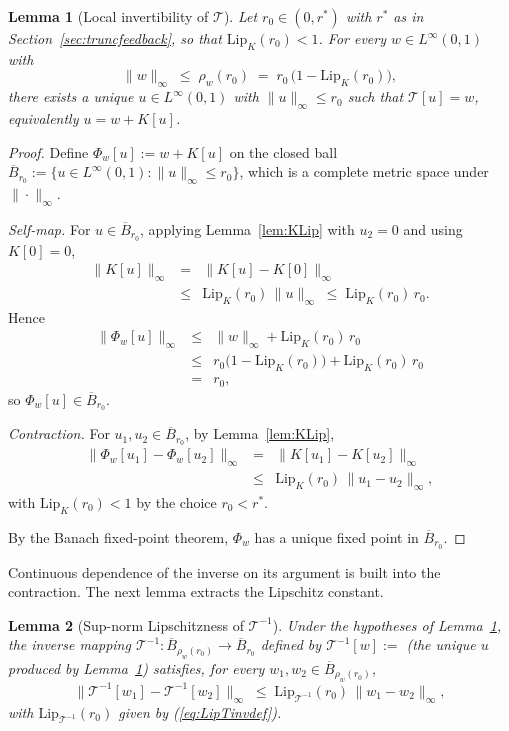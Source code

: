 \documentclass[amsthm]{autart}
\theoremstyle{plain}
\newtheorem{lemma}{Lemma}
\theoremstyle{definition}
\newcommand{\Tcal}{\mathcal{T}}
\newcommand{\Linf}{L^\infty}
\newcommand{\Lipk}{\mathrm{Lip}_K}
\newcommand{\LipT}{\mathrm{Lip}_{\Tcal^{-1}}}
\newcommand{\Bball}{\overline{B}}
\begin{document}
\begin{lemma}[Local invertibility of $\Tcal$]\label{lem:Tinv}
Let $r_0 \in (0, r^*)$ with $r^*$ as in Section~\ref{sec:truncfeedback}, so that $\Lipk(r_0) < 1$. For every $w \in \Linf(0,1)$ with
\begin{equation}
\|w\|_\infty \;\le\; \rho_w(r_0) \;=\; r_0\,\bigl(1 - \Lipk(r_0)\bigr),
\label{eq:winball}
\end{equation}
there exists a unique $u \in \Linf(0,1)$ with $\|u\|_\infty \le r_0$ such that $\Tcal[u] = w$, equivalently $u = w + K[u]$.
\end{lemma}

\begin{proof}
Define $\Phi_w[u] := w + K[u]$ on the closed ball $\Bball_{r_0} := \{u \in \Linf(0,1) : \|u\|_\infty \le r_0\}$, which is a complete metric space under $\|\cdot\|_\infty$.

\emph{Self-map.} For $u \in \Bball_{r_0}$, applying Lemma~\ref{lem:KLip} with $u_2 = 0$ and using $K[0] = 0$,
\begin{eqnarray}
\|K[u]\|_\infty &=& \|K[u] - K[0]\|_\infty \nonumber \\
&\le& \Lipk(r_0)\,\|u\|_\infty \;\le\; \Lipk(r_0)\, r_0.
\label{eq:Ku_norm}
\end{eqnarray}
Hence
\begin{eqnarray}
\|\Phi_w[u]\|_\infty &\le& \|w\|_\infty + \Lipk(r_0)\, r_0 \nonumber \\
&\le& r_0\bigl(1 - \Lipk(r_0)\bigr) + \Lipk(r_0)\, r_0 \nonumber \\
&=& r_0,
\label{eq:Phiw_norm}
\end{eqnarray}
so $\Phi_w[u] \in \Bball_{r_0}$.

\emph{Contraction.} For $u_1, u_2 \in \Bball_{r_0}$, by Lemma~\ref{lem:KLip},
\begin{eqnarray}
\|\Phi_w[u_1] - \Phi_w[u_2]\|_\infty &=& \|K[u_1] - K[u_2]\|_\infty \nonumber \\
&\le& \Lipk(r_0)\,\|u_1 - u_2\|_\infty,
\label{eq:Phiw_contract}
\end{eqnarray}
with $\Lipk(r_0) < 1$ by the choice $r_0 < r^*$.

By the Banach fixed-point theorem, $\Phi_w$ has a unique fixed point in $\Bball_{r_0}$.
\end{proof}

Continuous dependence of the inverse on its argument is built into the contraction. The next lemma extracts the Lipschitz constant.

\begin{lemma}[Sup-norm Lipschitzness of $\Tcal^{-1}$]\label{lem:TinvLip}
Under the hypotheses of Lemma~\ref{lem:Tinv}, the inverse mapping $\Tcal^{-1} : \Bball_{\rho_w(r_0)} \to \Bball_{r_0}$ defined by $\Tcal^{-1}[w] :=$ (the unique $u$ produced by Lemma~\ref{lem:Tinv}) satisfies, for every $w_1, w_2 \in \Bball_{\rho_w(r_0)}$,
\begin{equation}
\|\Tcal^{-1}[w_1] - \Tcal^{-1}[w_2]\|_\infty \;\le\; \LipT(r_0)\,\|w_1 - w_2\|_\infty,
\label{eq:TinvLip}
\end{equation}
with $\LipT(r_0)$ given by (\ref{eq:LipTinvdef}).
\end{lemma}
\end{document}
